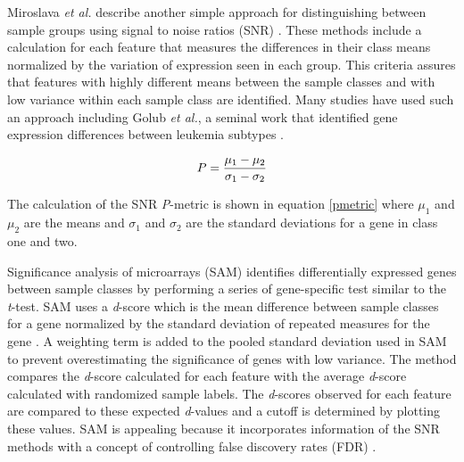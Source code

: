Miroslava \emph{et al.} describe another simple approach for distinguishing
between sample groups using signal to noise ratios (SNR)
\cite{PMID_164182572,PMID_12933571,yeang2001mcm,PMID_12384549}.  These methods
include a calculation for each feature that measures the differences in their
class means normalized by the variation of expression seen in each group.  This
criteria assures that features with highly different means between the sample
classes and with low variance within each sample class are identified.  Many
studies have used such an approach including Golub \emph{et al.}, a seminal
work that identified gene expression differences between leukemia subtypes
\cite{PMID_164182572,PMID_12933571,yeang2001mcm,PMID_12933571}.

\begin{equation}\label{pmetric}
P = { \mu_1 - \mu_2 \over {\sigma_1 - \sigma_2}}
\end{equation}

The calculation of the SNR \emph{P}-metric is shown in equation \eqref{pmetric}
where $\mu_1$ and $\mu_2$ are the means and $\sigma_1$ and $\sigma_2$ are the
standard deviations for a gene in class one and two.


Significance analysis of microarrays (SAM) identifies differentially expressed
genes between sample classes by performing a series of gene-specific test
similar to the \emph{t}-test.  SAM uses a \emph{d}-score which is the mean
difference between sample classes for a gene normalized by the standard
deviation of repeated measures for the gene \cite{tusher2001sam}.  A weighting
term is added to the pooled standard deviation used in SAM to prevent
overestimating the significance of genes with low variance.  The method
compares the \emph{d}-score calculated for each feature with the average
\emph{d}-score calculated with randomized sample labels.  The \emph{d}-scores
observed for each feature are compared to these expected \emph{d}-values and a
cutoff is determined by plotting these values. SAM is appealing because it
incorporates information of the SNR methods with a concept of controlling false
discovery rates (FDR) \cite{efron2001eba}.

% 
% 

